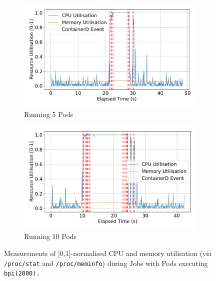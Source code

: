 \begin{figure}[ht!]
    \begin{subfigure}[b]{0.48\textwidth}
        \centering
        \includegraphics[width=\linewidth]{images/utilisation-smallbatch.pdf}
        \caption{Running 5 Pods} %
        \label{fig:utilisation-smallbatch}
    \end{subfigure}%
    \hfill
    \begin{subfigure}[b]{0.48\textwidth}
        \centering
        \includegraphics[width=\linewidth]{images/utilisation-bigbatch.pdf}
        \caption{Running 10 Pods} %
        \label{fig:utilisation-bigbatch}
    \end{subfigure}

    \caption{Measurements of [0,1]-normalised CPU and memory utilisation (via
    \texttt{/proc/stat} and \texttt{/proc/meminfo}) during Jobs with Pods
    executing \texttt{bpi(2000).}}
    \label{fig:utilisation-eval}
\end{figure}

